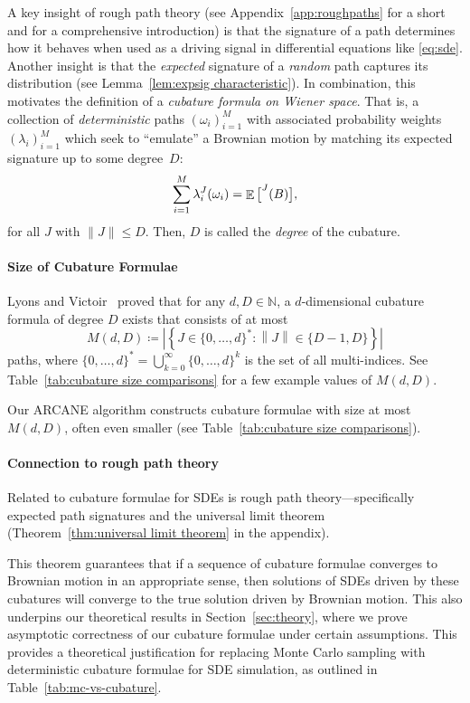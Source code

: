 \documentclass[11pt, letterpaper]{article}
\let\sig\relax
\DeclareMathOperator{\sig}{S}
\theoremstyle{definition}
\theoremstyle{remark}
\DeclareMathOperator{\E}{\mathbb{E}}
\newcommand{\N}{\mathbb{N}}
\newcommand{\short}{ARCANE\xspace}
\begin{document}
A key insight of rough path theory (see Appendix~\ref{app:roughpaths} for a short and \cite{terrystflour} for a comprehensive introduction) is that the signature of a path determines how it behaves when used as a driving signal in differential equations like \eqref{eq:sde}. Another insight is that the \emph{expected} signature of a \emph{random} path captures its distribution (see Lemma~\ref{lem:expsig characteristic}). In combination, this motivates the definition of a \emph{cubature formula on Wiener space}. That is, a collection of \emph{deterministic} paths $(\omega_i)_{i=1}^M$ with associated probability weights $(\lambda_i)_{i=1}^M$ which seek to ``emulate'' a Brownian motion by matching its expected signature up to some degree~$D$:
\[
\sum_{i=1}^M \lambda_i \sig^J(\omega_i) = \E\big[\sig^J(B)\big],
\]
for all $J$ with $\|J\| \leq D$. Then, $D$ is called the \emph{degree} of the cubature.

\paragraph{Size of Cubature Formulae}
Lyons and Victoir~\cite[Thm.\ 2.4]{lyons2004cubature} proved that for any $d,D\in\N$, a $d$-dimensional cubature formula of degree $D$ exists that consists of at most
\begin{equation}\label{eq:cubature size}
    M(d,D) \coloneqq \left| \left\{ J \in \{0, \ldots ,d\}^*\colon \left\|J\right\| \in \{D-1,D\} \right\}  \right|
\end{equation}
paths, where $\{0, \ldots ,d\}^* = \bigcup_{k =0} ^\infty \{0, \ldots ,d\}^k$ is the set of all multi-indices.
See Table~\ref{tab:cubature size comparisons} for a few example values of $M(d,D)$.

Our \short algorithm constructs cubature formulae with size at most $M(d,D)$, often even smaller (see Table~\ref{tab:cubature size comparisons}).

\paragraph{Connection to rough path theory}
Related to cubature formulae for SDEs is rough path theory---specifically expected path signatures \cite{chevyrev2022signature} and the universal limit theorem (Theorem~\ref{thm:universal limit theorem} in the appendix).
 
This theorem guarantees that if a sequence of cubature formulae converges to Brownian motion in an appropriate sense, then solutions of SDEs driven by these cubatures will converge to the true solution driven by Brownian motion. This also underpins our theoretical results in Section~\ref{sec:theory}, where we prove asymptotic correctness of our cubature formulae under certain assumptions. This provides a theoretical justification for replacing Monte Carlo sampling with deterministic cubature formulae for SDE simulation, as outlined in Table~\ref{tab:mc-vs-cubature}.
\end{document}
